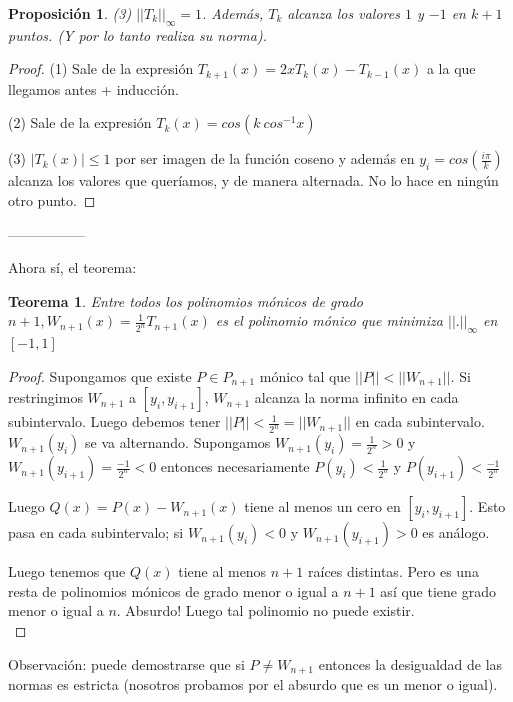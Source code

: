 \documentclass[10pt,a4paper,final]{report}
\newtheorem{theorem}{Teorema}
\newtheorem{proposition}{Proposición}
\begin{document}
{\begin{proposition}
(3) $||T_k||_\infty = 1$. Además, $T_k$ alcanza los valores $1$ y $-1$ en $k+1$ puntos. (Y por lo tanto realiza su norma).

\end{proposition}

\begin{proof}

(1) Sale de la expresión $T_{k+1}(x) = 2x T_k(x) - T_{k-1}(x)$ a la que llegamos antes + inducción.

(2)  Sale de la expresión $T_k(x) = cos(k\ cos^{-1}x)$

(3) $|T_k(x)|\leq 1$ por ser imagen de la función coseno y además en $y_i = cos(\frac{i\pi}{k})$ alcanza los valores que queríamos, y de manera alternada. No lo hace en ningún otro punto.
\end{proof}

-----------------


Ahora sí, el teorema: \\

\begin{theorem}Entre todos los polinomios mónicos de grado $n+1, W_{n+1}(x) = \frac{1}{2^n} T_{n+1}(x)$ es el polinomio mónico que minimiza $||.||_\infty$ en $[-1,1]$
\end{theorem}

\begin{proof}

Supongamos que existe $P\in P_{n+1}$ mónico tal que $||P|| < ||W_{n+1}||$. Si restringimos $W_{n+1}$ a $[y_i,y_{i+1}]$, $W_{n+1}$ alcanza la norma infinito en cada subintervalo. Luego debemos tener $||P|| < \frac{1}{2^n} = ||W_{n+1}||$ en cada subintervalo. $W_{n+1}(y_i)$ se va alternando. Supongamos $W_{n+1}(y_i) = \frac{1}{2^n} > 0$ y $W_{n+1}(y_{i+1}) = \frac{-1}{2^n} < 0$ entonces necesariamente $P(y_i) < \frac{1}{2^n}$ y $P(y_{i+1}) < \frac{-1}{2^n}$

Luego $Q(x)= P(x) - W_{n+1}(x)$ tiene al menos un cero en $[y_i,y_{i+1}]$. Esto pasa en cada subintervalo; si $W_{n+1}(y_i)<0$ y $W_{n+1}(y_{i+1})>0$ es análogo.

Luego tenemos que $Q(x)$ tiene al menos $n+1$ raíces distintas. Pero es una resta de polinomios mónicos de grado menor o igual a $n+1$ así que tiene grado menor o igual a $n$. Absurdo! Luego tal polinomio no puede existir.\\

\end{proof}

Observación: puede demostrarse que si $P \neq W_{n+1}$ entonces la desigualdad de las normas es estricta (nosotros probamos por el absurdo que es un menor o igual).\\


}
\end{document}
